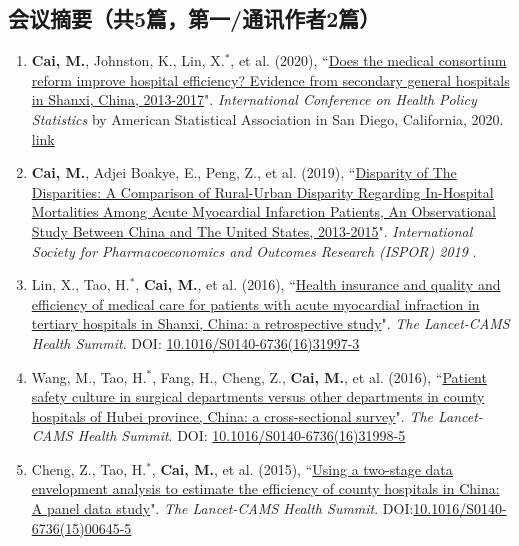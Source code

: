 \documentclass[11pt, a4paper]{article}
\newcommand{\years}[1]{\marginnote{\scriptsize #1}}
\begin{document}
	\subsection*{会议摘要（共5篇，第一/通讯作者2篇）}
	\begin{enumerate}[leftmargin=0ex,itemsep=1ex]
		\item  \years{2020}\textcolor{RubineRed}{\textbf{Cai, M.}}, Johnston, K., Lin, X.$^\ast$, et al. (2020), ``\ul{Does the medical consortium reform improve hospital efficiency? Evidence from secondary general hospitals in Shanxi, China, 2013-2017}". \emph{International Conference on Health Policy Statistics} by American Statistical Association in San Diego, California, 2020. \href{https://ww2.amstat.org/meetings/ichps/2020/onlineprogram/AbstractDetails.cfm?AbstractID=306703}{link}
		
		\item \years{2019}\textcolor{RubineRed}{\textbf{Cai, M.}}, Adjei Boakye, E., Peng, Z., et al. (2019), ``\ul{Disparity of The Disparities: A Comparison of Rural-Urban Disparity Regarding In-Hospital Mortalities Among Acute Myocardial Infarction Patients, An Observational Study Between China and The United States, 2013-2015}". \emph{International Society for Pharmacoeconomics and Outcomes Research (ISPOR) 2019 }. 
		
		\item \years{2016}Lin, X., Tao, H.$^\ast$, \textbf{Cai, M.}, et al. (2016), ``\ul{Health insurance and quality and efficiency of medical care for patients with acute myocardial infraction in tertiary hospitals in Shanxi, China: a retrospective study}". \emph{The Lancet-CAMS Health Summit}. DOI: \href{https://doi.org/10.1016/S0140-6736(16)31997-3}{10.1016/S0140-6736(16)31997-3}
		
		\item Wang, M., Tao, H.$^\ast$, Fang, H., Cheng, Z., \textbf{Cai, M.}, et al. (2016), ``\ul{Patient safety culture in surgical departments versus other departments in county hospitals of Hubei province, China: a cross-sectional survey}". \emph{The Lancet-CAMS Health Summit}. DOI: \href{https://doi.org/10.1016/S0140-6736(16)31998-5}{10.1016/S0140-6736(16)31998-5}
		
		\item \years{2015}Cheng, Z., Tao, H.$^\ast$, \textbf{Cai, M.}, et al.  (2015), ``\ul{Using a two-stage data envelopment analysis to estimate the efficiency of county hospitals in China: A panel data study}". \emph{The Lancet-CAMS Health Summit}. DOI:\href{https://doi.org/10.1016/S0140-6736(15)00645-5}{10.1016/S0140-6736(15)00645-5} 
	\end{enumerate}
	
\end{document}
